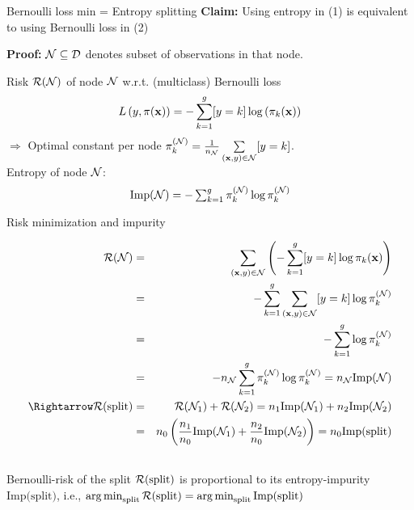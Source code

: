 \documentclass[11pt,compress,t,notes=noshow, xcolor=table]{beamer}
\begin{document}
\begin{vbframe}{Bernoulli loss min = Entropy splitting}
\textbf{Claim:} Using entropy in (1) 
    is equivalent to using Bernoulli loss in (2) %

\textbf{Proof:} %
$\mathcal{N} \subseteq \mathcal{D}$ denotes subset of observations in that node. 

Risk $\mathcal{R}(\mathcal{N})$ of node $\mathcal{N}$ w.r.t. (multiclass) Bernoulli loss  
$$
  L\left(y, \pi(\mathbf{x})\right) = -\sum_{k = 1}^g [y = k] \log \left(\pi_k(\mathbf{x})\right)
$$
$\Rightarrow$ Optimal constant per node $\pi_k^{(\mathcal{N})} = \frac{1}{n_{\mathcal{N}}} \sum\limits_{(\mathbf{x},y) \in \mathcal{N}} [y = k]$.\\

Entropy of node $\mathcal{N}$:
$$
\text{Imp}(\Np) = -\textstyle\sum_{k = 1}^g \pikN \log \pikN %
$$






\end{vbframe}
\begin{vbframe}{Risk minimization and impurity}

\begin{footnotesize}
\begin{eqnarray*}
\risk(\Np) &=& \sum_{\xy \in \Np} \left(- \sum_{k = 1}^g [y = k] \log \pi_k(\xv) \right) \\
&=& -\sum_{k = 1}^g \sum_{\xy \in \Np} [y = k]\log \pikN \\
&=& -\sum_{k = 1}^g \log \pikN %
\\
 &=& -n_{\Np} \sum_{k = 1}^g \pikN \log \pikN = n_\Np \text{Imp}(\Np)\\
 \Rightarrow \risk(\text{split}) &=& \risk(\Np_1) + \risk(\Np_2)  = n_1 \text{Imp}(\Np_1) + n_2 \text{Imp}(\Np_2)\\
 &=&n_0 \left(\frac{n_1}{n_0} \text{Imp}(\Np_1) + \frac{n_2}{n_0} \text{Imp}(\Np_2)\right) = n_0\text{Imp(split)}\\
\
\end{eqnarray*} 
Bernoulli-risk of the split $\mathcal{R}(\text{split})$ is proportional to its entropy-impurity $\text{Imp(split)}$, i.e., $\mathop{\mathrm{arg\,min}}_\text{split} \mathcal{R}(\text{split}) = \mathop{\mathrm{arg\,min}}_\text{split} \text{Imp(split)}$ \\

\end{footnotesize}


\end{vbframe}
\end{document}
